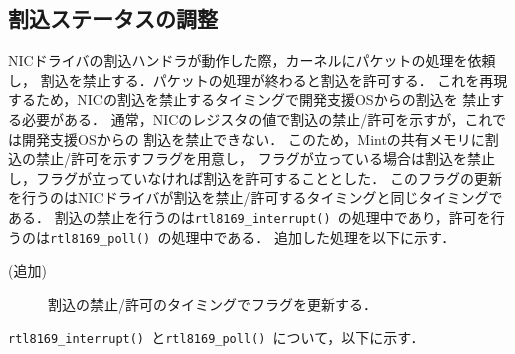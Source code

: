 \documentclass[12pt]{jsarticle}
\begin{document}
\subsection{割込ステータスの調整}
NICドライバの割込ハンドラが動作した際，カーネルにパケットの処理を依頼し，
割込を禁止する．パケットの処理が終わると割込を許可する．
これを再現するため，NICの割込を禁止するタイミングで開発支援OSからの割込を
禁止する必要がある．
通常，NICのレジスタの値で割込の禁止/許可を示すが，これでは開発支援OSからの
割込を禁止できない．
このため，Mintの共有メモリに割込の禁止/許可を示すフラグを用意し，
フラグが立っている場合は割込を禁止し，フラグが立っていなければ割込を許可することとした．
このフラグの更新を行うのはNICドライバが割込を禁止/許可するタイミングと同じタイミングである．
割込の禁止を行うのは{\tt rtl8169\_interrupt() }の処理中であり，許可を行うのは{\tt rtl8169\_poll() }の処理中である．
追加した処理を以下に示す．
\begin{description}
    \item[(追加)]割込の禁止/許可のタイミングでフラグを更新する．
\end{description}
{\tt rtl8169\_interrupt() }と{\tt rtl8169\_poll() }について，以下に示す．
\end{document}

